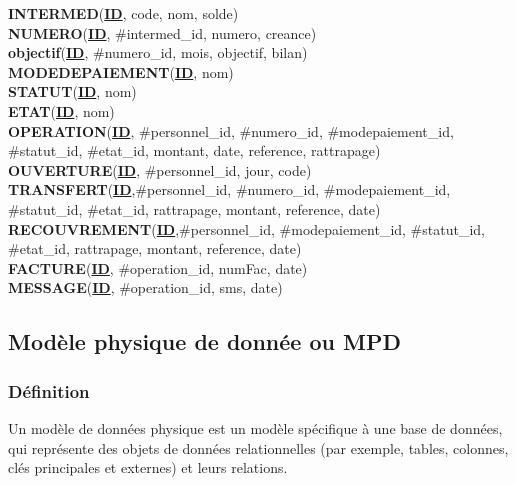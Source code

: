 					\textbf{INTERMED}(\underline{\textbf{ID}}, code, nom, solde)\\
					
					
					\textbf{NUMERO}(\underline{\textbf{ID}}, \#intermed\_id, numero, creance)\\
					
					\textbf{objectif}(\underline{\textbf{ID}}, \#numero\_id, mois, objectif, bilan)\\
					
					\textbf{MODEDEPAIEMENT}(\underline{\textbf{ID}}, nom)\\
					
					\textbf{STATUT}(\underline{\textbf{ID}}, nom)\\
					
					\textbf{ETAT}(\underline{\textbf{ID}}, nom)\\
					
					\textbf{OPERATION}(\underline{\textbf{ID}}, \#personnel\_id, \#numero\_id, \#modepaiement\_id, \#statut\_id, \#etat\_id, montant, date, reference, rattrapage)\\
					
					\textbf{OUVERTURE}(\underline{\textbf{ID}}, \#personnel\_id, jour, code)\\
					
					\textbf{TRANSFERT}(\underline{\textbf{ID}},\#personnel\_id, \#numero\_id, \#modepaiement\_id, \#statut\_id, \#etat\_id, rattrapage, montant, reference, date)\\
					
					\textbf{RECOUVREMENT}(\underline{\textbf{ID}},\#personnel\_id, \#modepaiement\_id, \#statut\_id, \#etat\_id, rattrapage, montant, reference, date)\\
					
					\textbf{FACTURE}(\underline{\textbf{ID}}, \#operation\_id, numFac, date)\\
					
					\textbf{MESSAGE}(\underline{\textbf{ID}}, \#operation\_id, sms, date)\\
			\subsection{Modèle physique de donnée ou MPD}
			
				\subsubsection{Définition}
					Un modèle de données physique est un modèle spécifique à une base de données, qui représente des objets de données relationnelles (par exemple, tables, colonnes, clés principales et externes) et leurs relations.
